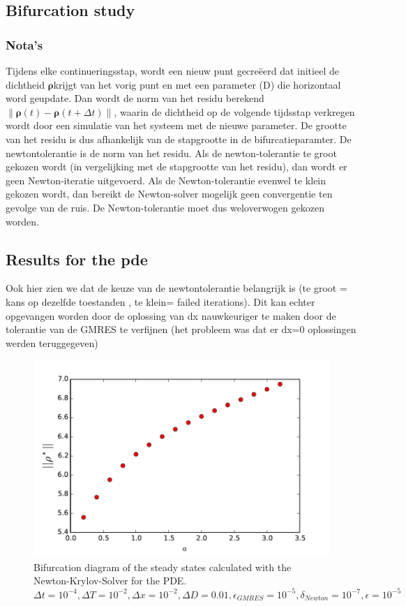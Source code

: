 \documentclass[]{article}
\newcommand{\norm}[1]{\left\|#1\right\|} %
\newcommand{\U}{\ensuremath{\boldsymbol{\rho}}}
\theoremstyle{definition}
\begin{document}
\subsection{Bifurcation study}



\subsubsection{Nota's}
Tijdens elke continueringsstap, wordt een nieuw punt gecreëerd dat initieel de dichtheid \U krijgt van het vorig punt en met een parameter (D) die horizontaal word geupdate. Dan wordt de norm van het residu berekend $\norm{ \U(t) - \U(t+\Delta t)} $, waarin de dichtheid op de volgende tijdsstap verkregen wordt door een simulatie van het systeem met de nieuwe parameter. De grootte van het residu is dus afhankelijk van de stapgrootte in de bifurcatieparamter. De newtontolerantie is de norm van het residu. Als de newton-tolerantie te groot gekozen wordt (in vergelijking met de stapgrootte van het residu), dan wordt er geen Newton-iteratie uitgevoerd. Als de Newton-tolerantie evenwel te klein gekozen wordt, dan bereikt de Newton-solver mogelijk geen convergentie ten gevolge van de ruis. De Newton-tolerantie moet dus weloverwogen gekozen worden. 

\subsection{Results for the pde}
Ook hier zien we dat de keuze van de newtontolerantie belangrijk is (te groot = kans op dezelfde toestanden , te klein= failed iterations).
Dit kan echter opgevangen worden door de oplossing van dx nauwkeuriger te maken door de tolerantie van de GMRES te verfijnen (het probleem was dat er dx=0 oplossingen werden teruggegeven) 

\begin{figure}
\includegraphics{../Problems/WeightedParticles/checkSystem/plots/bifurcation_pde(D)}
\caption{  Bifurcation diagram of the steady states calculated with the Newton-Krylov-Solver for the PDE. $\Delta t = 10^{-4}, \Delta T = 10^{-2}, \Delta x = 10^{-2}, \Delta D = 0.01, \epsilon_{GMRES}=10^{-5},  \delta_{Newton} = 10^{-7}, \epsilon=10^{-5}$
}
\end{figure}
\end{document}
